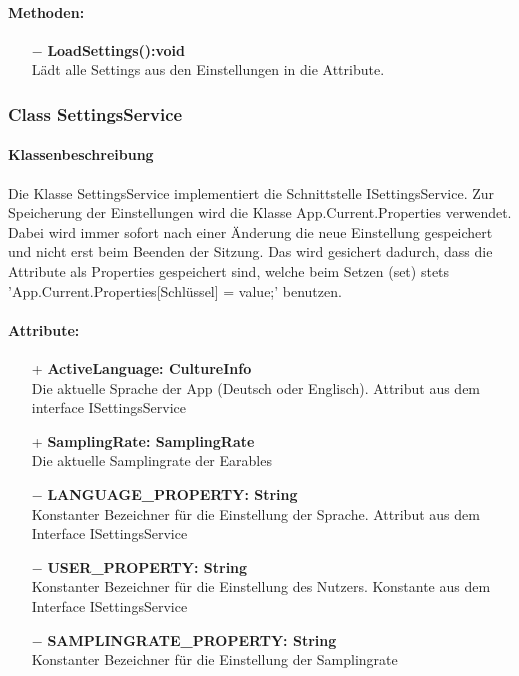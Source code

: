 \documentclass[a4paper,12pt]{article}
\begin{document}
	\paragraph{Methoden:}
	\begin{itemize}
		\item[$-$] \textbf{LoadSettings():void}\\Lädt alle Settings aus den Einstellungen in die Attribute.	
	\end{itemize}
\subsubsection{Class SettingsService}
	\paragraph{Klassenbeschreibung}
	Die Klasse SettingsService implementiert die Schnittstelle ISettingsService. Zur Speicherung der Einstellungen wird die Klasse App.Current.Properties verwendet.
	Dabei wird immer sofort nach einer Änderung die neue Einstellung gespeichert und nicht erst beim Beenden der Sitzung.
	Das wird gesichert dadurch, dass die Attribute als Properties gespeichert sind, welche beim Setzen (set) stets 'App.Current.Properties[Schlüssel] = value;' benutzen.
	\paragraph{Attribute:}
	\begin{itemize}
		\item[+] \textbf{ActiveLanguage: CultureInfo}\\Die aktuelle Sprache der App (Deutsch oder Englisch). Attribut aus dem interface ISettingsService\\
		\item[+] \textbf{SamplingRate: SamplingRate}\\Die aktuelle Samplingrate der \Gls{Earables} \\ 
		\item[$-$] \textbf{LANGUAGE\_PROPERTY: String}\\Konstanter Bezeichner für die Einstellung der Sprache. Attribut aus dem Interface ISettingsService \\
		\item[$-$] \textbf{USER\_PROPERTY: String}\\Konstanter Bezeichner für die Einstellung des Nutzers. Konstante aus dem Interface ISettingsService \\
		\item[$-$] \textbf{SAMPLINGRATE\_PROPERTY: String}\\Konstanter Bezeichner für die Einstellung der Samplingrate \\
	\end{itemize}
\end{document}
